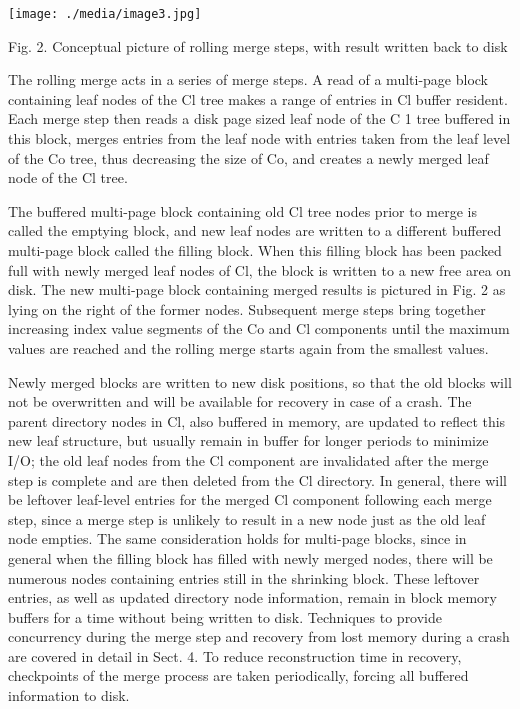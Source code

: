 \documentclass[a4paper,11pt,notitlepage,twoside,openright]{article}
\begin{document}
\texttt{[image: ./media/image3.jpg]}

Fig. 2. Conceptual picture of rolling merge steps, with result written
back to disk

The rolling merge acts in a series of merge steps. A read of a
multi-page block containing leaf nodes of the Cl tree makes a range of
entries in Cl buffer resident. Each merge step then reads a disk page
sized leaf node of the C 1 tree buffered in this block, merges entries
from the leaf node with entries taken from the leaf level of the Co
tree, thus decreasing the size of Co, and creates a newly merged leaf
node of the Cl tree.

The buffered multi-page block containing old Cl tree nodes prior to
merge is called the emptying block, and new leaf nodes are written to a
different buffered multi-page block called the filling block. When this
filling block has been packed full with newly merged leaf nodes of Cl,
the block is written to a new free area on disk. The new multi-page
block containing merged results is pictured in Fig. 2 as lying on the
right of the former nodes. Subsequent merge steps bring together
increasing index value segments of the Co and Cl components until the
maximum values are reached and the rolling merge starts again from the
smallest values.

Newly merged blocks are written to new disk positions, so that the old
blocks will not be overwritten and will be available for recovery in
case of a crash. The parent directory nodes in Cl, also buffered in
memory, are updated to reflect this new leaf structure, but usually
remain in buffer for longer periods to minimize I/O; the old leaf nodes
from the Cl component are invalidated after the merge step is complete
and are then deleted from the Cl directory. In general, there will be
leftover leaf-level entries for the merged Cl component following each
merge step, since a merge step is unlikely to result in a new node just
as the old leaf node empties. The same consideration holds for
multi-page blocks, since in general when the filling block has filled
with newly merged nodes, there will be numerous nodes containing entries
still in the shrinking block. These leftover entries, as well as updated
directory node information, remain in block memory buffers for a time
without being written to disk. Techniques to provide concurrency during
the merge step and recovery from lost memory during a crash are covered
in detail in Sect. 4. To reduce reconstruction time in recovery,
checkpoints of the merge process are taken periodically, forcing all
buffered information to disk.
\end{document}
